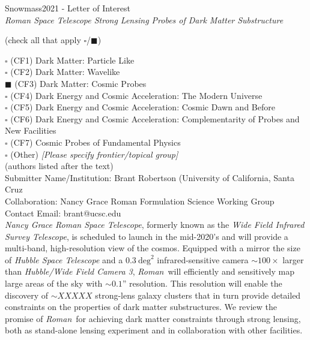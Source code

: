 \documentclass[11pt]{article}
\newcommand{\RST}{\emph{Roman}~}
\begin{document}
\begin{raggedright} 
\huge
Snowmass2021 - Letter of Interest \hfill \\[+1em]
\textit{Roman Space Telescope Strong Lensing Probes of Dark Matter Substructure} \hfill \\[+1em]
\end{raggedright}

\normalsize

  (check all that apply $\square$/$\blacksquare$)

\noindent $\square$ (CF1) Dark Matter: Particle Like \\
\noindent $\square$ (CF2) Dark Matter: Wavelike  \\ 
\noindent $\blacksquare$ (CF3) Dark Matter: Cosmic Probes  \\
\noindent $\square$ (CF4) Dark Energy and Cosmic Acceleration: The Modern Universe \\
\noindent $\square$ (CF5) Dark Energy and Cosmic Acceleration: Cosmic Dawn and Before \\
\noindent $\square$ (CF6) Dark Energy and Cosmic Acceleration: Complementarity of Probes and New Facilities \\
\noindent $\square$ (CF7) Cosmic Probes of Fundamental Physics \\
\noindent $\square$ (Other) {\it [Please specify frontier/topical group]} \\

 (authors listed after the text)\\
Submitter Name/Institution: Brant Robertson (University of California, Santa Cruz\\
Collaboration: Nancy Grace Roman Formulation Science Working Group\\
Contact Email: brant@ucsc.edu\\

\emph{Nancy Grace Roman Space Telescope}, formerly known as 
the \emph{Wide Field Infrared Survey Telescope}, is scheduled to launch in the mid-2020's and will provide a
multi-band, high-resolution view of the cosmos. Equipped with a mirror the size of \emph{Hubble
Space Telescope} and a $0.3~\mathrm{deg}^2$ infrared-sensitive camera $\sim100\times$ larger than \emph{Hubble/Wide Field Camera 3},
\RST will efficiently and sensitively map large areas of the sky with $\sim0.1$'' resolution.
This resolution will enable the discovery of $\sim XXXXX$ strong-lens galaxy clusters that 
in turn provide detailed constraints on the properties of dark matter substructures. We
review the promise of \RST for achieving dark matter constraints through strong lensing,
both as stand-alone lensing experiment and in collaboration with other facilities.
\end{document}
